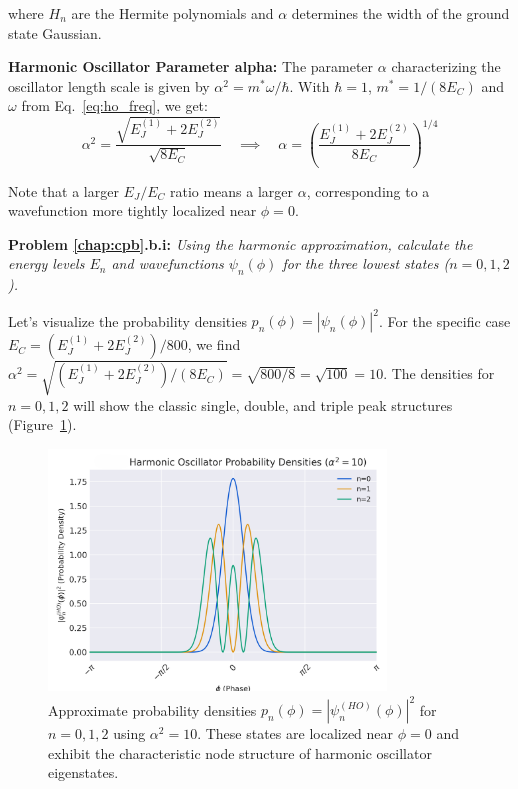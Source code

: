 \documentclass{book}
\newenvironment{keyresult}[1][Key Result]{\begin{framed}\noindent\textbf{#1:}}{\end{framed}}
\newenvironment{problem}[1][Problem]{\par\medskip\noindent\textbf{#1:}\em}{\par\medskip}
\begin{document}
where \(H_n\) are the Hermite polynomials and \(\alpha\) determines the width of the ground state Gaussian.
\begin{keyresult}[Harmonic Oscillator Parameter alpha]
The parameter \(\alpha\) characterizing the oscillator length scale is given by \(\alpha^2 = m^*\omega/\hbar\). With \(\hbar=1\), \(m^*=1/(8E_C)\) and \(\omega\) from Eq.~\ref{eq:ho_freq}, we get:
\[
\alpha^2 = \frac{\sqrt{E_J^{(1)} + 2 E_J^{(2)}}}{\sqrt{8 E_C}} \quad \implies \quad \alpha = \left( \frac{E_J^{(1)} + 2 E_J^{(2)}}{8 E_C} \right)^{1/4}
\]
\end{keyresult}
Note that a larger \(E_J/E_C\) ratio means a larger \(\alpha\), corresponding to a wavefunction more tightly localized near \(\phi=0\).

\begin{problem}[Problem \ref{chap:cpb}.b.i] 
Using the harmonic approximation, calculate the energy levels \(E_n\) and wavefunctions \(\psi_n(\phi)\) for the three lowest states (\(n=0, 1, 2\)).
\end{problem}

Let's visualize the probability densities \(p_n(\phi) = |\psi_n(\phi)|^2\). For the specific case \(E_C = (E_J^{(1)} + 2 E_J^{(2)}) / 800\), we find \(\alpha^2 = \sqrt{(E_J^{(1)} + 2 E_J^{(2)}) / (8 E_C)} = \sqrt{800/8} = \sqrt{100} = 10\). The densities for \(n=0, 1, 2\) will show the classic single, double, and triple peak structures (Figure~\ref{fig:ho_probs}).

\begin{figure}[h]
    \centering
    \includegraphics[width=0.8\textwidth]{fig_ho_prob.png}
    \caption[Harmonic oscillator probability densities]{Approximate probability densities \(p_n(\phi)=|\psi_n^{(HO)}(\phi)|^2\) for \(n=0, 1, 2\) using \(\alpha^2=10\). These states are localized near \(\phi=0\) and exhibit the characteristic node structure of harmonic oscillator eigenstates.}
    \label{fig:ho_probs}
\end{figure}
\end{document}
